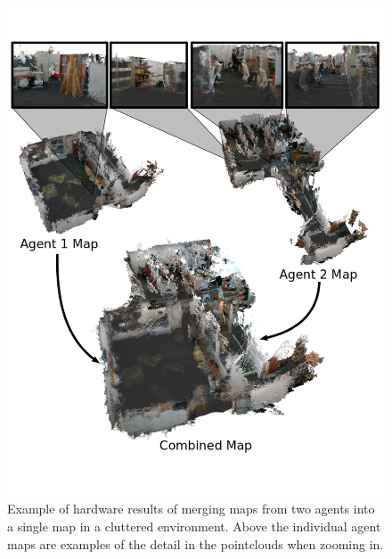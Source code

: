\documentclass[letterpaper, 10 pt, conference]{ieeeconf}  %
\begin{document}
\begin{figure}
\centering
\includegraphics[width=0.9\linewidth]{lab_map.png}
\caption{Example of hardware results of merging maps from two agents into a single map in a cluttered environment. Above the individual agent maps are examples of the detail in the pointclouds when zooming in.}
\label{fig:lab_map}
\end{figure}
\end{document}
